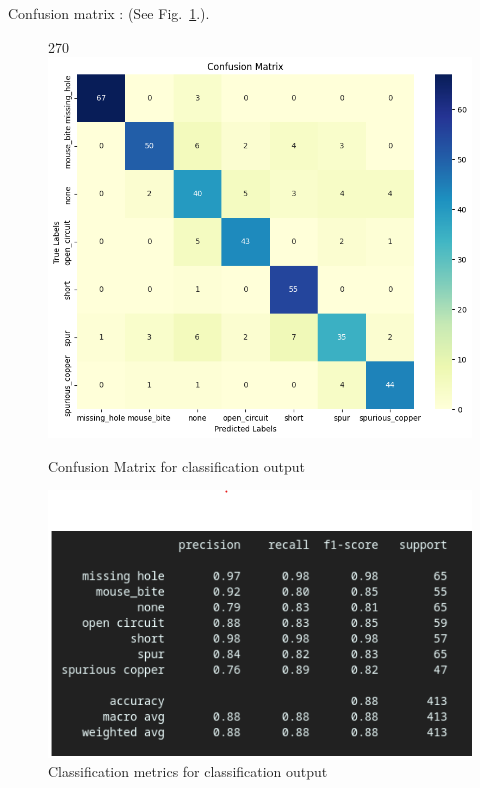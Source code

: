 \documentclass[12pt]{article}
\begin{document}
Confusion matrix : (See Fig.~\ref{fig:confusion_unet}.).
\begin{figure}[H]
    \centering
    \begin{turn}{270}
    \includegraphics[width=0.7\paperwidth,height=0.7\paperheight,keepaspectratio]{./graphics/confusionmatrix_unet.png}
    \end{turn}
    \caption{Confusion Matrix for classification output}
    \label{fig:confusion_unet}
\end{figure}
\restoregeometry

\begin{figure}[H]
    \centering
    \includegraphics[width=1\textwidth]{./graphics/classification_report_unet.png}
    \caption{Classification metrics for classification output}
    \label{fig:classification_report_unet}
\end{figure}
\end{document}
